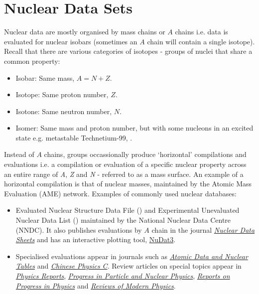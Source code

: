 \section{Nuclear Data Sets}
Nuclear data are mostly organised by mass chains or \(A\) chains i.e. data is evaluated for nuclear isobars (sometimes an \(A\) chain will contain a single isotope). Recall that there are various categories of isotopes - groups of nuclei that share a common property:
\begin{itemize}
    \item Isobar: Same mass, \(A = N + Z\).
    \item Isotope: Same proton number, \(Z\).
    \item Isotone: Same neutron number, \(N\).
    \item Isomer: Same mass and proton number, but with some nucleons in an excited state e.g. metastable Technetium-99, .
\end{itemize}
Instead of \(A\) chains, groups occassionally produce `horizontal' compilations and evaluations i.e. a compilation or evaluation of a specific nuclear property across an entire range of \textit{A}, \textit{Z} and \textit{N} - referred to as a mass surface. An example of a horizontal compilation is that of nuclear masses, maintained by the Atomic Mass Evaluation (AME) network. 
Examples of commonly used nuclear databases:
\begin{itemize}
    \item Evaluated Nuclear Structure Data File (\ensdf) and Experimental Unevaluated Nuclear Data List (\xundl) maintained by the National Nuclear Data Centre (NNDC). It also publishes evaluations by \(A\) chain in the journal \href{https://www.sciencedirect.com/journal/nuclear-data-sheets}{\textit{Nuclear Data Sheets}} and has an interactive plotting tool, \href{https://www.nndc.bnl.gov/nudat3/}{NuDat3}.
    \item Specialised evaluations appear in journals such as \href{https://www.sciencedirect.com/journal/atomic-data-and-nuclear-data-tables}{\textit{Atomic Data and Nuclear Tables}} and \href{https://iopscience.iop.org/journal/1674-1137}{\textit{Chinese Physics C}}. Review articles on special topics appear in \href{https://www.sciencedirect.com/journal/physics-reports}{\textit{Physics Reports}}, \href{https://www.sciencedirect.com/journal/progress-in-particle-and-nuclear-physics}{\textit{Progress in Particle and Nuclear Physics}}, \href{https://iopscience.iop.org/journal/0034-4885}{\textit{Reports on Progress in Physics}} and \href{https://journals.aps.org/rmp/}{\textit{Reviews of Modern Physics}}.
\end{itemize}


